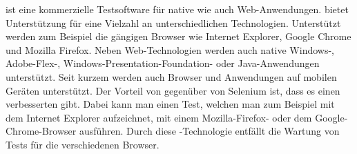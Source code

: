  \cite{SilkTest} ist eine kommerzielle Testsoftware für native wie auch Web-Anwendungen.  bietet Unterstützung für eine Vielzahl an unterschiedlichen Technologien. Unterstützt werden zum Beispiel die gängigen Browser wie Internet Explorer, Google Chrome und Mozilla Firefox. Neben Web-Technologien werden auch native Windows-, Adobe-Flex-, Windows-Presentation-Foundation- oder Java-Anwendungen unterstützt. Seit kurzem werden auch Browser und Anwendungen  auf mobilen Geräten unterstützt. Der Vorteil von  gegenüber von Selenium ist, dass es einen verbesserten  gibt. Dabei kann man einen Test, welchen man zum Beispiel mit dem Internet Explorer aufzeichnet, mit einem Mozilla-Firefox- oder dem Google-Chrome-Browser ausführen. Durch diese -Technologie entfällt die Wartung von Tests für die verschiedenen Browser. 
